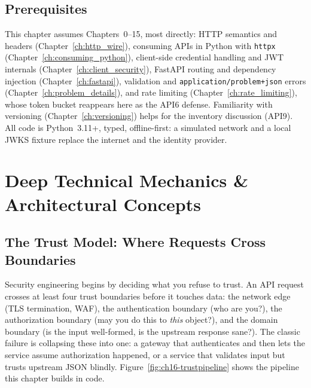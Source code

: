 \subsection*{Prerequisites}

This chapter assumes Chapters~0--15, most directly: HTTP semantics and
headers (Chapter~\ref{ch:http_wire}), consuming APIs in Python with
\texttt{httpx} (Chapter~\ref{ch:consuming_python}), client-side credential
handling and JWT internals (Chapter~\ref{ch:client_security}), FastAPI
routing and dependency injection (Chapter~\ref{ch:fastapi}), validation and
\texttt{application/problem+json} errors
(Chapter~\ref{ch:problem_details}), and rate limiting
(Chapter~\ref{ch:rate_limiting}), whose token bucket reappears here as the
API6 defense. Familiarity with versioning (Chapter~\ref{ch:versioning})
helps for the inventory discussion (API9). All code is Python~3.11+, typed,
offline-first: a simulated network and a local JWKS fixture replace the
internet and the identity provider.

\section{Deep Technical Mechanics \& Architectural Concepts}
\label{sec:ch16-mechanics}

\subsection{The Trust Model: Where Requests Cross Boundaries}
\label{sec:ch16-trustmodel}

Security engineering begins by deciding what you refuse to trust. An API
request crosses at least four trust boundaries before it touches data: the
network edge (TLS termination, WAF), the authentication boundary (who are
you?), the authorization boundary (may you do this to \emph{this} object?),
and the domain boundary (is the input well-formed, is the upstream response
sane?). The classic failure is collapsing these into one: a gateway that
authenticates and then lets the service assume authorization happened, or a
service that validates input but trusts upstream JSON blindly.
Figure~\ref{fig:ch16-trustpipeline} shows the pipeline this chapter builds
in code.

